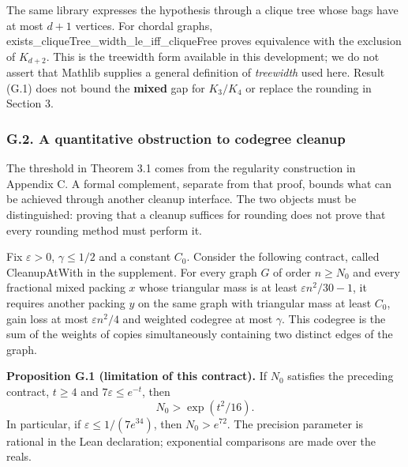\documentclass[english,11pt,a4paper]{article}
\begin{document}
The same library expresses the hypothesis through a clique tree whose bags have at most \(d+1\) vertices. For chordal graphs, {\ttfamily\small exists\_\discretionary{\hbox{\ensuremath{\hookrightarrow}}}{}{}cliqueTree\_\discretionary{\hbox{\ensuremath{\hookrightarrow}}}{}{}width\_\discretionary{\hbox{\ensuremath{\hookrightarrow}}}{}{}le\_\discretionary{\hbox{\ensuremath{\hookrightarrow}}}{}{}iff\_\discretionary{\hbox{\ensuremath{\hookrightarrow}}}{}{}cliqueFree} proves equivalence with the exclusion of \(K_{d+2}\). This is the treewidth form available in this development; we do not assert that Mathlib supplies a general definition of \emph{treewidth} used here. Result (G.1) does not bound the \textbf{mixed} gap for \(K_3/K_4\) or replace the rounding in Section 3.

\subsubsection{G.2. A quantitative obstruction to codegree cleanup}\label{g.2.-a-quantitative-obstruction-to-codegree-cleanup}

The threshold in Theorem 3.1 comes from the regularity construction in Appendix C. A formal complement, separate from that proof, bounds what can be achieved through another cleanup interface. The two objects must be distinguished: proving that a cleanup suffices for rounding does not prove that every rounding method must perform it.

Fix \(\varepsilon>0\), \(\gamma\le1/2\) and a constant \(C_0\). Consider the following contract, called {\ttfamily\small CleanupAtWit\discretionary{\hbox{\ensuremath{\hookrightarrow}}}{}{}h} in the supplement. For every graph \(G\) of order \(n\ge N_0\) and every fractional mixed packing \(x\) whose triangular mass is at least \(\varepsilon n^2/30-1\), it requires another packing \(y\) on the same graph with triangular mass at least \(C_0\), gain loss at most \(\varepsilon n^2/4\) and weighted codegree at most \(\gamma\). This codegree is the sum of the weights of copies simultaneously containing two distinct edges of the graph.

\textbf{Proposition G.1 (limitation of this contract).} If \(N_0\) satisfies the preceding contract, \(t\ge4\) and \(7\varepsilon\le e^{-t}\), then \[
N_0>\exp(t^2/16).
\tag{G.2}
\] In particular, if \(\varepsilon\le1/(7e^{34})\), then \(N_0>e^{72}\). The precision parameter is rational in the Lean declaration; exponential comparisons are made over the reals.
\end{document}
